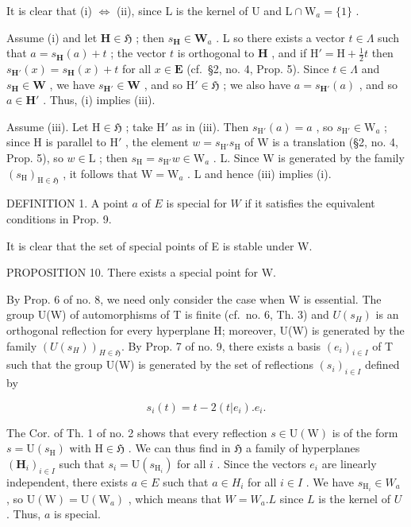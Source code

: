 It is clear that (i) \(\Leftrightarrow\) (ii), since L is the kernel of U and \(\mathrm{L} \cap \mathrm{W}_a = \{1\}\) .

Assume (i) and let \(\mathbf{H} \in \mathfrak{H}\) ; then \(s_{\mathbf{H}} \in \mathbf{W}_a\) . L so there exists a vector \(t \in \Lambda\) such that \(a = s_{\mathbf{H}}(a) + t\) ; the vector \(t\) is orthogonal to \(\mathbf{H}\) , and if \(\mathrm{H}' = \mathrm{H} + \frac{1}{2} t\) then \(s_{\mathbf{H}'}(x) = s_{\mathbf{H}}(x) + t\) for all \(x \in \mathbf{E}\) (cf.~§2, no. 4, Prop. 5). Since \(t \in \Lambda\) and \(s_{\mathbf{H}} \in \mathbf{W}\) , we have \(s_{\mathbf{H}'} \in \mathbf{W}\) , and so \(\mathrm{H}' \in \mathfrak{H}\) ; we also have \(a = s_{\mathbf{H}'}(a)\) , and so \(a \in \mathbf{H}'\) . Thus, (i) implies (iii).

Assume (iii). Let \(\mathrm{H} \in \mathfrak{H}\) ; take \(\mathrm{H}'\) as in (iii). Then \(s_{\mathrm{H}'}(a) = a\) , so \(s_{\mathrm{H}'} \in \mathrm{W}_a\) ; since \(\mathrm{H}\) is parallel to \(\mathrm{H}'\) , the element \(w = s_{\mathrm{H}'} s_{\mathrm{H}}\) of \(\mathrm{W}\) is a translation (§2, no. 4, Prop. 5), so \(w \in \mathrm{L}\) ; then \(s_{\mathrm{H}} = s_{\mathrm{H}'} w \in \mathrm{W}_a\) . L. Since \(\mathrm{W}\) is generated by the family \((s_{\mathrm{H}})_{\mathrm{H} \in \mathfrak{H}}\) , it follows that \(\mathrm{W} = \mathrm{W}_a\) . L and hence (iii) implies (i).

DEFINITION 1. A point \(a\) of \(E\) is special for \(W\) if it satisfies the equivalent conditions in Prop. 9.

It is clear that the set of special points of E is stable under W.

PROPOSITION 10. There exists a special point for W.

By Prop. 6 of no. 8, we need only consider the case when W is essential. The group U(W) of automorphisms of T is finite (cf.~no. 6, Th. 3) and \(U(s_{H})\) is an orthogonal reflection for every hyperplane H; moreover, U(W) is generated by the family \((U(s_{H}))_{H \in \mathfrak{H}}\). By Prop. 7 of no. 9, there exists a basis \((e_{i})_{i \in I}\) of T such that the group U(W) is generated by the set of reflections \((s_{i})_{i \in I}\) defined by

\[
s _ {i} (t) = t - 2 (t | e _ {i}). e _ {i}.
\]

The Cor. of Th. 1 of no. 2 shows that every reflection \(s \in \mathrm{U}(\mathrm{W})\) is of the form \(s = \mathrm{U}(s_{\mathrm{H}})\) with \(\mathrm{H} \in \mathfrak{H}\) . We can thus find in \(\mathfrak{H}\) a family of hyperplanes \((\mathbf{H}_i)_{i \in I}\) such that \(s_i = \mathrm{U}(s_{\mathrm{H}_i})\) for all \(i\) . Since the vectors \(e_i\) are linearly independent, there exists \(a \in E\) such that \(a \in H_i\) for all \(i \in I\) . We have \(s_{\mathrm{H}_i} \in W_a\) , so \(\mathrm{U}(\mathrm{W}) = \mathrm{U}(\mathrm{W}_a)\) , which means that \(W = W_a.L\) since \(L\) is the kernel of \(U\) . Thus, \(a\) is special.

